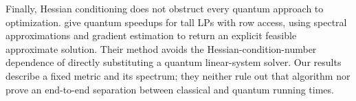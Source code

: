 Finally, Hessian conditioning does not obstruct every quantum approach
to optimization. \citet{apersgribling2026} give quantum speedups for
tall LPs with row access, using spectral approximations and gradient
estimation to return an explicit feasible approximate solution. Their
method avoids the Hessian-condition-number dependence of directly
substituting a quantum linear-system solver. Our results describe a
fixed metric and its spectrum; they neither rule out that algorithm
nor prove an end-to-end separation between
classical and quantum running times.
